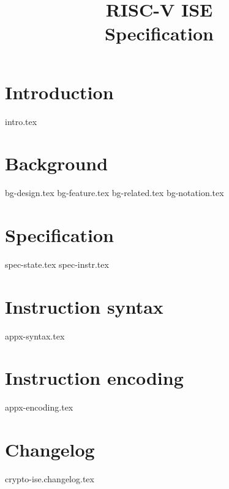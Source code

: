 \documentclass{article}
\title{RISC-V \ISE ISE \\ Specification}
\begin{document}
\maketitle \tableofcontents


\section{Introduction}
\label{sec:intro}

{intro.tex}


\section{Background}
\label{sec:bg}

{bg-design.tex}
{bg-feature.tex}
{bg-related.tex}
{bg-notation.tex}


\section{Specification}
\label{sec:spec}

{spec-state.tex}
{spec-instr.tex}


\printbibliography


\appendix

\newpage
\section{Instruction syntax}
\label{appx:syntax}

{appx-syntax.tex}

\newpage
\section{Instruction encoding}
\label{appx:encoding}

{appx-encoding.tex}

\newpage
\section{Changelog}
\label{appx:changelog}

{crypto-ise.changelog.tex}

\end{document}
